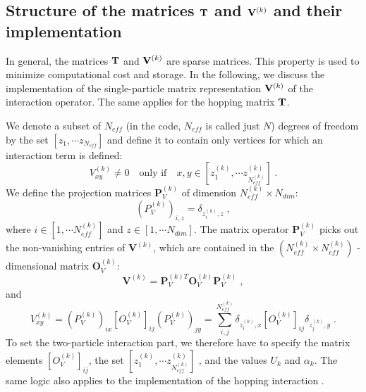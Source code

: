 \subsection{Structure of the matrices ${\bf T}$ and ${\bf V}^{(k)}$ and their implementation}

In general, the matrices ${\bf T}$ and ${\bf V}^{(k)}$ are sparse matrices. 
This property is used to minimize computational cost and storage.
In the following, we discuss the implementation of the single-particle matrix representation ${\bf V}^{(k)}$ of the interaction operator. 
The same applies for the hopping matrix ${\bf T}$.

We denote a subset of $N_{eff}$ (in the code, $N_{eff}$ is called just $N$) degrees of freedom  by the set  $[z_{1},\cdots  z_{N_{eff}}]$ and define it to contain only vertices for which an interaction term is defined:
\begin{equation}
V^{(k)}_{x y}\neq 0\quad \text{only if} \quad x,y \in [z_{1}^{(k)},\cdots  z_{N_{eff}^{(k)}}^{(k)}]\;.
\end{equation}
We define the projection matrices $\mathbf{P}^{(k)}_{V}$ of dimension $N_{eff}^{(k)}\times N_{dim}$:
\begin{equation}
(P_{V}^{(k)})_{i,z}=\delta_{z_{i}^{(k)},z}\;,
\end{equation}
where $i\in [1,\cdots N_{eff}^{(k)}]$ and $z\in [1,\cdots N_{dim}]$. The matrix operator $\bm{P}^{(k)}_{V}$ picks out the non-vanishing entries of $\bm{V}^{(k)}$, 
which are contained in the $(N_{eff}^{(k)}\times N_{eff}^{(k)})$ - dimensional matrix $\bm{O}_{V}^{(k)}$:
\begin{equation}
\bm{V}^{(k)}=\bm{P}^{(k) T}_{V} \bm{O}_{V}^{(k)}\bm{P}^{(k)}_{V}\;,
\end{equation}
and
\begin{equation}
V_{xy}^{(k)}=(P^{(k)}_{V})_{ix} \left[O_{V}^{(k)}\right]_{ij}(P_{V}^{(k)})_{jy}=\sum\limits_{i,j}^{N_{eff}^{(k)}} \delta_{z_{i}^{(k)},x}  \left[O_{V}^{(k)}\right]_{ij} \delta_{z_{j}^{(k)},y} \;.
\end{equation}
To set the two-particle interaction part, we therefore have to specify the matrix elements $\left[O_{V}^{(k)}\right]_{ij}$, the set $[z_{1}^{(k)},\cdots  z_{N_{eff}^{(k)}}^{(k)}]$ , and the values $U_{k}$ and $\alpha_{k}$.
The same logic also applies to the implementation of the hopping interaction .

